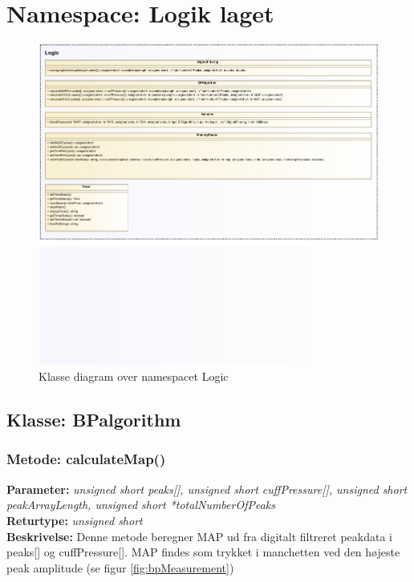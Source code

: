 \section{Namespace: Logik laget}

\begin{figure}[H]
\includegraphics[trim = 0 170 0 0, clip = true, width=\textwidth]{klassediagram_Logic-crop.pdf}
\caption{Klasse diagram over namespacet Logic}\label{fig:classDiagramLogic}
\end{figure}

\subsection{Klasse: BPalgorithm}

\subsubsection{Metode: calculateMap()}
\textbf{Parameter: } \textit{unsigned short peaks[], unsigned short cuffPressure[], unsigned short peakArrayLength, unsigned short *totalNumberOfPeaks}
\\ \textbf{Returtype: } \textit{unsigned short}
\\ \textbf{Beskrivelse: } Denne metode beregner MAP ud fra digitalt filtreret peakdata i peaks[] og cuffPressure[]. MAP findes som trykket i manchetten ved den højeste peak amplitude (se figur \ref{fig:bpMeasurement})

